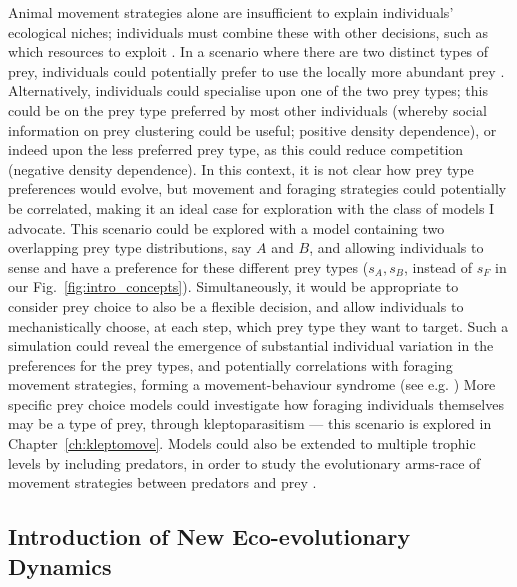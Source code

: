 Animal movement strategies alone are insufficient to explain individuals' ecological niches; individuals must combine these with other decisions, such as which resources to exploit \parencite{vangils2015,pulliam1974}.
In a scenario where there are two distinct types of prey, individuals could potentially prefer to use the locally more abundant prey \parencite{emlen1966,pulliam1974}.
Alternatively, individuals could specialise upon one of the two prey types; this could be on the prey type preferred by most other individuals (whereby social information on prey clustering could be useful; positive density dependence), or indeed upon the less preferred prey type, as this could reduce competition (negative density dependence).
In this context, it is not clear how prey type preferences would evolve, but movement and foraging strategies could potentially be correlated, making it an ideal case for exploration with the class of models I advocate.
This scenario could be explored with a model containing two overlapping prey type distributions, say $A$ and $B$, and allowing individuals to sense and have a preference for these different prey types ($s_A, s_B$, instead of $s_F$ in our Fig.~\ref{fig:intro_concepts}).
Simultaneously, it would be appropriate to consider prey choice to also be a flexible decision, and allow individuals to mechanistically choose, at each step, which prey type they want to target.
Such a simulation could reveal the emergence of substantial individual variation in the preferences for the prey types, and potentially correlations with foraging movement strategies, forming a movement-behaviour syndrome (see e.g. \cite{eckhardt1979})
More specific prey choice models could investigate how foraging individuals themselves may be a type of prey, through kleptoparasitism --- this scenario is explored in Chapter~\ref{ch:kleptomove}.
Models could also be extended to multiple trophic levels by including predators, in order to study the evolutionary arms-race of movement strategies between predators and prey \parencite{netz2021}.

\subsection*{Introduction of New Eco-evolutionary Dynamics}

